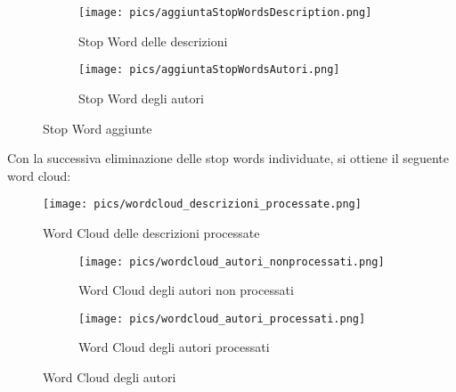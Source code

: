 \documentclass[12pt,oneside]{article}
\begin{document}
\begin{enumerate}
    \begin{figure}[H]
    \begin{subfigure}{0.15\textwidth}
    \texttt{[image: pics/aggiuntaStopWordsDescription.png]} 
    \begin{justify}
    \caption{Stop Word delle descrizioni}  
    \end{justify}
    \label{fig:subim1}
    \end{subfigure}
    \hspace{3cm}
    \begin{subfigure}{0.17\textwidth}
    \texttt{[image: pics/aggiuntaStopWordsAutori.png]}
    \begin{justify}
    \caption{Stop Word degli autori}   
    \end{justify}
    \label{fig:subim2}
    \end{subfigure}
    \caption{Stop Word aggiunte}
    \end{figure}

    \newpage
    \begin{justify}
    Con la successiva eliminazione delle stop words individuate, si ottiene il seguente word cloud:
    \end{justify}
    \begin{figure}[H]
    \centering
    \texttt{[image: pics/wordcloud\_descrizioni\_processate.png]}
    \caption{Word Cloud delle descrizioni processate}
    \end{figure}

    \hfill
    \hfill
    \begin{figure}[H]
    \begin{subfigure}{0.48\textwidth}
    \texttt{[image: pics/wordcloud\_autori\_nonprocessati.png]} 
    \caption{Word Cloud degli autori non processati}
    \label{fig:subim1}
    \end{subfigure}
    \begin{subfigure}{0.48\textwidth}
    \texttt{[image: pics/wordcloud\_autori\_processati.png]}
    \caption{Word Cloud degli autori processati}
    \label{fig:subim2}
    \end{subfigure}
    \caption{Word Cloud degli autori}
    \end{figure}
    \end{enumerate}
\end{document}
